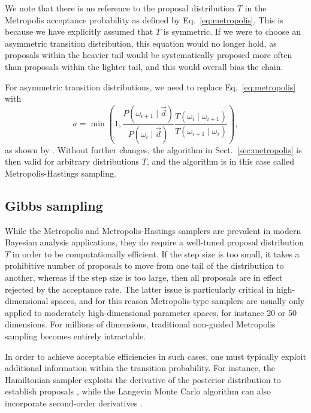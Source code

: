 \documentclass[twocolumn]{aa}
\renewcommand{\d}[0]{\vec{d}}
\begin{document}
We note that there is no reference to the proposal distribution $T$ in
the Metropolis acceptance probability as defined by
Eq.~\eqref{eq:metropolis}. This is because we have explicitly assumed
that $T$ is symmetric. If we were to choose an asymmetric transition
distribution, this equation would no longer hold, as proposals within
the heavier tail would be systematically proposed more often than
proposals within the lighter tail, and this would overall bias the
chain. 

For asymmetric transition distributions, we need to replace
Eq.~\eqref{eq:metropolis} with
\begin{equation}
  a = \min\left(1,
  \frac{P(\omega_{i+1}\mid \d)}{P(\omega_i\mid \d)}\frac{T(\omega_{i}\mid
    \omega_{i+1})}{T(\omega_{i+1}\mid \omega_i)}\right),
  \label{eq:metropolis-hastings}  
\end{equation}
as shown by \citet{hastings:1970}.  Without further changes, the
algorithm in Sect.~\ref{sec:metropolis} is then valid for arbitrary
distributions $T$, and the algorithm is in this case called
Metropolis-Hastings sampling.

\subsection{Gibbs sampling}
\label{sec:gibbs}

While the Metropolis and Metropolis-Hastings samplers are prevalent in
modern Bayesian analysis applications, they do require a well-tuned
proposal distribution $T$ in order to be computationally efficient. If
the step size is too small, it takes a prohibitive number of proposals
to move from one tail of the distribution to another, whereas if the
step size is too large, then all proposals are in effect rejected by
the acceptance rate. The latter issue is particularly critical in
high-dimensional spaces, and for this reason Metropolis-type samplers
are usually only applied to moderately high-dimensional parameter
spaces, for instance 20 or 50 dimensions. For millions of dimensions,
traditional non-guided Metropolis sampling becomes entirely intractable.

In order to achieve acceptable efficiencies in such cases, one must
typically exploit additional information within the transition
probability. For instance, the Hamiltonian sampler exploits the
derivative of the posterior distribution to establish proposals
\citep[e.g,][]{liu:2008}, while the Langevin Monte Carlo algorithm can
also incorporate second-order derivatives \citep{girolami:2011}.
\end{document}
